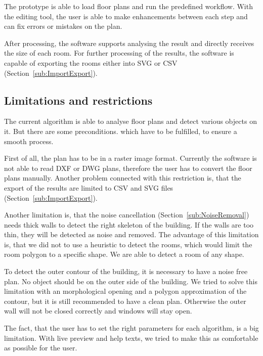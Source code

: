 The prototype is able to load floor plans and run the predefined workflow. With the editing tool, the user is able to make enhancements between each step and can fix errors or mistakes on the plan.

After processing, the software supports analysing the result and directly receives the size of each room. For further processing of the results, the software is capable of exporting the rooms either into SVG or CSV (Section~\ref{sub:ImportExport}).

\subsection{Limitations and restrictions}
The current algorithm is able to analyse floor plans and detect various objects on it. But there are some preconditions. which have to be fulfilled, to ensure a smooth process.

First of all, the plan has to be in a raster image format. Currently the software is not able to read DXF or DWG plans, therefore the user has to convert the floor plans manually. Another problem connected with this restriction is, that the export of the results are limited to CSV and SVG files (Section~\ref{sub:ImportExport}).

Another limitation is, that the noise cancellation (Section~\ref{sub:NoiseRemoval}) needs thick walls to detect the right skeleton of the building. If the walls are too thin, they will be detected as noise and removed. The advantage of this limitation is, that we did not to use a heuristic to detect the rooms, which would limit the room polygon to a specific shape. We are able to detect a room of any shape.

To detect the outer contour of the building, it is necessary to have a noise free plan. No object should be on the outer side of the building. We tried to solve this limitation with an morphological opening and a polygon approximation of the contour, but it is still recommended to have a clean plan. Otherwise the outer wall will not be closed correctly and windows will stay open.

The fact, that the user has to set the right parameters for each algorithm, is a big limitation. With live preview and help texts, we tried to make this as comfortable as possible for the user.

